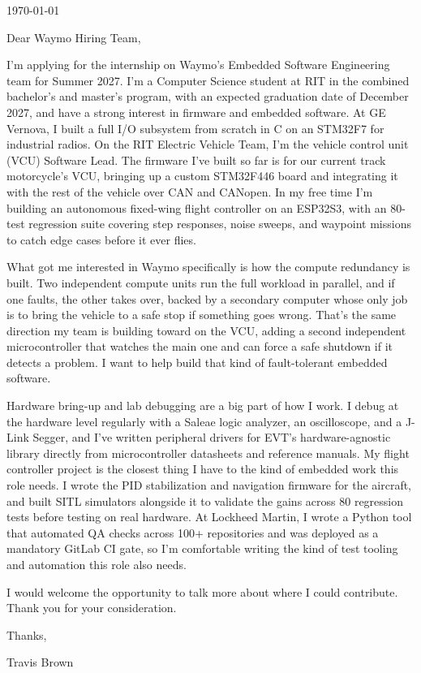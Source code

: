 \documentclass[11pt]{article}
\begin{document}
\begin{flushright}
  \today
\end{flushright}

Dear Waymo Hiring Team,

I'm applying for the internship on Waymo's Embedded Software Engineering
team for Summer 2027. I'm a Computer Science student at RIT in the
combined bachelor's and
master's program, with an expected graduation date of December 2027, and
have a strong interest in firmware and embedded software. At GE Vernova, I
built a full I/O subsystem from scratch in C on an STM32F7 for industrial
radios. On the RIT Electric Vehicle Team, I'm the vehicle control unit
(VCU) Software Lead. The firmware I've built so far is for our current
track motorcycle's VCU, bringing up a custom STM32F446 board and
integrating it with the rest of the vehicle over CAN and CANopen. In my
free time I'm building an autonomous fixed-wing flight controller on an
ESP32S3, with an 80-test regression suite covering step responses, noise
sweeps, and waypoint missions to catch edge cases before it ever flies.

What got me interested in Waymo specifically is how the compute redundancy
is built. Two independent compute units run the full workload in parallel,
and if one faults, the other takes over, backed by a secondary computer
whose only job is to bring the vehicle to a safe stop if something goes
wrong. That's the same direction my team is building toward on the VCU,
adding a second independent microcontroller that watches the main one and
can force a safe shutdown if it detects a problem. I want to help build
that kind of fault-tolerant embedded software.

Hardware bring-up and lab debugging are a big part of how I work. I debug
at the hardware level regularly with a Saleae logic analyzer, an
oscilloscope, and a J-Link Segger, and I've written peripheral drivers for
EVT's hardware-agnostic library directly from microcontroller datasheets
and reference manuals. My
flight controller project is the closest thing I have to the kind of
embedded work this role needs. I wrote the PID stabilization and navigation
firmware for the aircraft, and built SITL simulators alongside it to
validate the gains across 80 regression tests before testing on real
hardware. At Lockheed Martin, I wrote a
Python tool that automated QA checks across 100+ repositories and was
deployed as a mandatory GitLab CI gate, so I'm comfortable writing the kind
of test tooling and automation this role also needs.

I would welcome the opportunity to talk more about where I could
contribute. Thank you for your consideration.

Thanks,

Travis Brown
\end{document}
